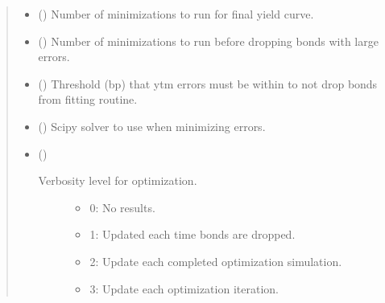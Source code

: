 \documentclass[letterpaper,10pt,english]{report}
\begin{document}
\begin{fulllineitems}
\begin{fulllineitems}
\begin{quote}
\begin{description}
\begin{itemize}
\item {} 
 (\sphinxstyleliteralemphasis{\sphinxupquote{, }}) \textendash{} Number of minimizations to run for final yield curve.

\item {} 
 (\sphinxstyleliteralemphasis{\sphinxupquote{, }}) \textendash{} Number of minimizations to run before dropping bonds
with large errors.

\item {} 
 (\sphinxstyleliteralemphasis{\sphinxupquote{, }}) \textendash{} Threshold (bp) that ytm errors must be within to not drop bonds
from fitting routine.

\item {} 
 (\sphinxstyleliteralemphasis{\sphinxupquote{, }}) \textendash{} Scipy solver to use when minimizing errors.

\item {} 
 (\sphinxstyleliteralemphasis{\sphinxupquote{, }}) \textendash{} \begin{description}
\item[{Verbosity level for optimization.}] \leavevmode\begin{itemize}
\item {} 
0: No results.

\item {} 
1: Updated each time bonds are dropped.

\item {} 
2: Update each completed optimization simulation.

\item {} 
3: Update each optimization iteration.

\end{itemize}

\end{description}



\end{itemize}
\end{description}
\end{quote}
\end{fulllineitems}
\end{fulllineitems}
\end{document}
